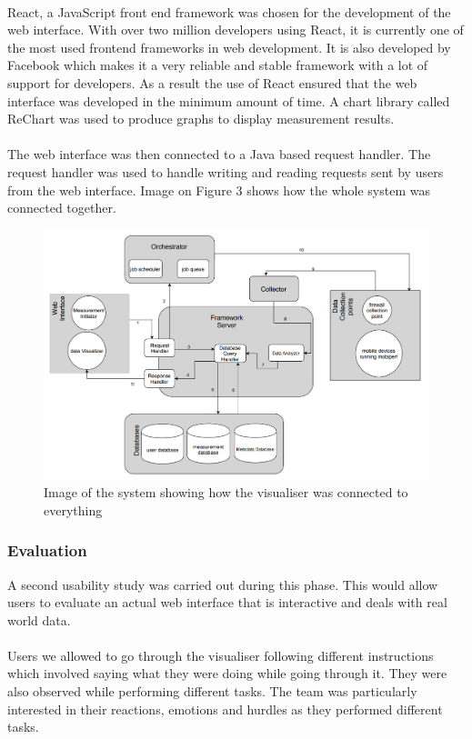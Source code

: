 \paragraph{}
React, a JavaScript front end framework was chosen for the development of the web interface. With over two million developers using React, it is currently one of the most used frontend frameworks in web development\cite{githubreact}. It is also developed by Facebook which makes it a very reliable and stable framework with a lot of support for developers\cite{githubreact}. As a result the use of React ensured that the web interface was developed in the minimum amount of time. A chart library called ReChart was used to produce graphs to display measurement results.
\paragraph{}
The web interface was then connected to a Java based request handler. The request handler was used to handle writing and reading requests sent by users from the web interface. Image on Figure 3 shows how the whole system was connected together.
\begin{figure}
	\centering
	\includegraphics[width=0.7\linewidth]{images/system}
	\caption{Image of the system showing how the visualiser was connected to everything}
	\label{fig:system}
\end{figure}


\subsubsection{Evaluation}
A second usability study was carried out during this phase. This would allow users to evaluate an actual web interface that is interactive and deals with real world data.
\paragraph{}
Users we allowed to go through the visualiser following different instructions which involved saying what they were doing while going through it. They were also observed while performing different tasks. The team was particularly interested in their reactions, emotions and hurdles as they performed different tasks.
